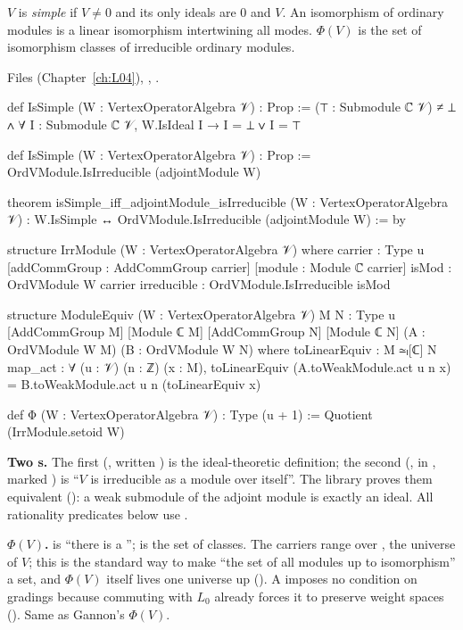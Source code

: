 \begin{definition}\label{l12:def:phi}
$V$ is \emph{simple} if $V\neq0$ and its only ideals are $0$ and $V$. An isomorphism of ordinary modules is a linear
isomorphism intertwining all modes. $\Phi(V)$ is the set of isomorphism classes of irreducible ordinary modules.
\end{definition}
\noindent Files  (Chapter~\ref{ch:L04}),
, .
\begin{leancode}
def IsSimple (W : VertexOperatorAlgebra 𝒱) : Prop :=
  (⊤ : Submodule ℂ 𝒱) ≠ ⊥ ∧ ∀ I : Submodule ℂ 𝒱, W.IsIdeal I → I = ⊥ ∨ I = ⊤

def IsSimple (W : VertexOperatorAlgebra 𝒱) : Prop :=
  OrdVModule.IsIrreducible (adjointModule W)

theorem isSimple_iff_adjointModule_isIrreducible (W : VertexOperatorAlgebra 𝒱) :
    W.IsSimple ↔ OrdVModule.IsIrreducible (adjointModule W) := by

structure IrrModule (W : VertexOperatorAlgebra 𝒱) where
  carrier : Type u
  [addCommGroup : AddCommGroup carrier]
  [module : Module ℂ carrier]
  isMod : OrdVModule W carrier
  irreducible : OrdVModule.IsIrreducible isMod

structure ModuleEquiv (W : VertexOperatorAlgebra 𝒱) {M N : Type u} [AddCommGroup M]
    [Module ℂ M] [AddCommGroup N] [Module ℂ N] (A : OrdVModule W M) (B : OrdVModule W N) where
  toLinearEquiv : M ≃ₗ[ℂ] N
  map_act : ∀ (u : 𝒱) (n : ℤ) (x : M),
    toLinearEquiv (A.toWeakModule.act u n x) = B.toWeakModule.act u n (toLinearEquiv x)

def Φ (W : VertexOperatorAlgebra 𝒱) : Type (u + 1) := Quotient (IrrModule.setoid W)
\end{leancode}

\begin{dictionary}
\textbf{Two s.} The first (, written ) is the
ideal-theoretic definition; the second (, in , marked
) is ``$V$ is irreducible as a module over itself''. The library proves them equivalent
(): a weak submodule of the adjoint module is exactly an ideal. All
rationality predicates below use .

\textbf{$\Phi(V)$.}  is ``there is a '';  is the set of classes. The
carriers range over , the universe of $V$; this is the standard way to make ``the set of all modules up to
isomorphism'' a set, and $\Phi(V)$ itself lives one universe up (). A  imposes no
condition on gradings because commuting with $L_0$ already forces it to preserve weight spaces
(). Same as Gannon's $\Phi(V)$.
\end{dictionary}

